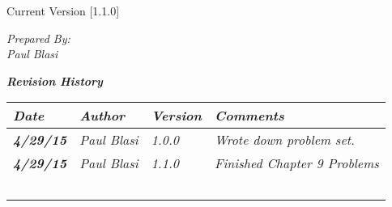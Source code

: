 


Current Version [1.1.0]
\vspace*{5mm}

{\color{MSBlue3}
\noindent
\textit{Prepared By:}\\
\textit{Paul Blasi}\\
}

\vfill
\noindent
{\color{color02} \textit{\textbf{Revision History}}}\\
\begin{tabular}{|>{\raggedright}p{1.5cm}|>{\raggedright}p{3cm}|>{\raggedright}p{1.5cm}|>{\raggedright}p{9cm}|}
\hline
\textit{\textbf{Date}} &  \textit{\textbf{Author}} & \textit{\textbf{Version}} & \textit{\textbf{Comments}}\tabularnewline
\hline
 \textit{\textbf{4/29/15}} & \textit{Paul Blasi} & \textit{1.0.0} & \textit{Wrote down problem set.}\tabularnewline
\hline
\textit{\textbf{4/29/15}} & \textit{Paul Blasi} & \textit{1.1.0} & \textit{Finished Chapter 9 Problems}\tabularnewline
\hline
 &  &  & \tabularnewline
 \hline
 &  &  & \tabularnewline
\hline
 &  &  & \tabularnewline
\hline
 &  &  & \tabularnewline
\hline
 &  &  & \tabularnewline
\hline
\end{tabular}
\vfill

